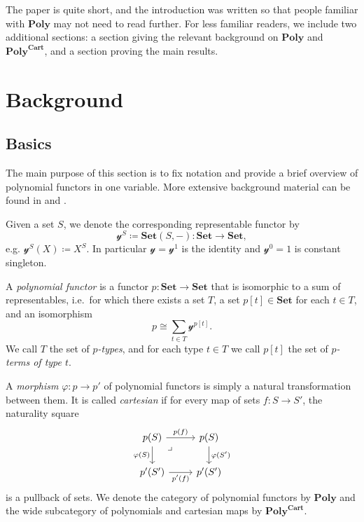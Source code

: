 \documentclass[11pt, one side, article]{memoir}
\theoremstyle{definition}
\theoremstyle{plain}
\newenvironment{definition}
  {\pushQED{\qed}\renewcommand{\qedsymbol}{$\lozenge$}\definitionx}
  {\popQED\enddefinitionx}
\newcommand{\Cat}[1]{\mathbf{#1}}%
\newcommand{\smset}{\Cat{Set}}
\newcommand{\yon}{\mathcal{y}}
\newcommand{\poly}{\Cat{Poly}}
\newcommand{\polycart}{\poly^{\Cat{Cart}}}
\newcommand{\0}{\textsf{0}}
\newcommand{\1}{\tn{\textsf{1}}}
\begin{document}
The paper is quite short, and the introduction was written so that people familiar with $\poly$ may not need to read further. For less familiar readers, we include two additional sections: a section giving the relevant background on $\poly$ and $\polycart$, and a section proving the main results.

\chapter{Background}

\section{Basics}


The main purpose of this section is to fix notation and provide a brief overview of polynomial functors in one variable. More extensive background material can be found in \cite{spivak2022poly} and \cite{kock2012polynomial}. 

\begin{definition}[Polynomial functor]\label{def.poly}
Given a set $S$, we denote the corresponding representable functor by
\[\yon^S\coloneqq\smset(S,-)\colon\smset\to\smset,\]
e.g. $\yon^S(X)\coloneqq X^S$. In particular $\yon=\yon^1$ is the identity and $\yon^0=1$ is constant singleton.

A \emph{polynomial functor} is a functor $p\colon\smset\to\smset$ that is isomorphic to a sum of representables, i.e.\ for which there exists a set $T$, a set $p[t]\in\smset$ for each $t\in T$, and an isomorphism
\[
p\cong\sum_{t\in T}\yon^{p[t]}.
\]
We call $T$ the set of \emph{$p$-types}, and for each type $t\in T$ we call $p[t]$ the set of \emph{$p$-terms of type $t$}.%

A \emph{morphism} $\varphi\colon p\to p'$ of polynomial functors is simply a natural transformation between them. It is called \emph{cartesian} if for every map of sets $f\colon S\to S'$, the naturality square
\[
\begin{tikzcd}
  p(S)\ar[r, "p(f)"]\ar[d, "\varphi(S)"']&p(S)\ar[d, "\varphi(S')"]\\
  p'(S')\ar[r, "p'(f)"']&p'(S')\ar[ul, phantom, very near end, "\lrcorner"]
\end{tikzcd}
\]
is a pullback of sets. We denote the category of polynomial functors by $\poly$ and the wide subcategory of polynomials and cartesian maps by $\polycart$.\end{definition}
\end{document}
